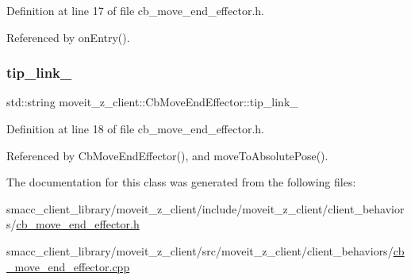 Definition at line 17 of file cb\+\_\+move\+\_\+end\+\_\+effector.\+h.



Referenced by on\+Entry().

\mbox{\label{classmoveit__z__client_1_1CbMoveEndEffector_abd92e9d3d67bdde11f9e38e0b44a2b8b}} 
\subsubsection{\texorpdfstring{tip\+\_\+link\+\_\+}{tip\_link\_}}
{\footnotesize\ttfamily std\+::string moveit\+\_\+z\+\_\+client\+::\+Cb\+Move\+End\+Effector\+::tip\+\_\+link\+\_\+}



Definition at line 18 of file cb\+\_\+move\+\_\+end\+\_\+effector.\+h.



Referenced by Cb\+Move\+End\+Effector(), and move\+To\+Absolute\+Pose().



The documentation for this class was generated from the following files\+:\begin{DoxyCompactItemize}
\item 
smacc\+\_\+client\+\_\+library/moveit\+\_\+z\+\_\+client/include/moveit\+\_\+z\+\_\+client/client\+\_\+behaviors/\hyperlink{cb__move__end__effector_8h}{cb\+\_\+move\+\_\+end\+\_\+effector.\+h}\item 
smacc\+\_\+client\+\_\+library/moveit\+\_\+z\+\_\+client/src/moveit\+\_\+z\+\_\+client/client\+\_\+behaviors/\hyperlink{cb__move__end__effector_8cpp}{cb\+\_\+move\+\_\+end\+\_\+effector.\+cpp}\end{DoxyCompactItemize}
